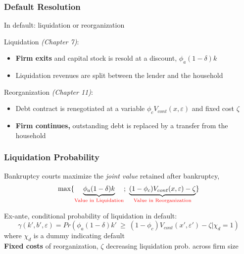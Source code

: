 \documentclass[aspectratio=169,xcolor=table]{beamer}
\begin{document}
\begin{frame}[label=LiqReorg] \frametitle{Default Resolution}

In default: liquidation or reorganization \hfill \hyperlink{Default}{} \vspace{5mm}

Liquidation \textit{(Chapter 7)}:
\begin{itemize} \small
    \item \textbf{Firm exits} and capital stock is resold at a discount, $\phi_a(1-\delta)k$
    \item Liquidation revenues are split between the lender and the household
\end{itemize} \normalsize \vspace{7mm}

Reorganization \textit{(Chapter 11)}:
\begin{itemize} \small
    \item Debt contract is renegotiated at a variable $\phi_c V_{cont}(x,\varepsilon)$ and fixed cost $\zeta$
    \item \textbf{Firm continues,} outstanding debt is replaced by a transfer from the household
\end{itemize} \normalsize   

\end{frame}

\begin{frame}[label=LiqReorg2] \frametitle{Liquidation Probability}

Bankruptcy courts maximize the \textit{joint value} retained after bankruptcy,
\begin{equation*} \label{eq:liquidation decision}
    \max \{ \underbrace{\phi_a (1-\delta) k}_{\textcolor{red}{\text{Value in Liquidation}}}   ; \ \underbrace{(1-\phi_c) V_{cont}(x,\varepsilon)- \zeta}_{\textcolor{red}{\text{Value in Reorganization}}}   \} 
\end{equation*}


Ex-ante, conditional probability of liquidation in default: 
\begin{equation*} \label{eq:liquidation probability}
    \gamma(k', b', \varepsilon) = Pr(\phi_a (1-\delta) k' \ \geq \ (1-\phi_c) V_{cont}(x',\varepsilon') - \zeta | \chi_d = 1)
\end{equation*}  
\small where $\chi_d$ is a dummy indicating default \normalsize \vspace{5mm} \\
\textbf{Fixed costs} of reorganization, $\zeta$ decreasing liquidation prob. across firm size     \hfill \hyperlink{liqprob}{}

\end{frame}
\end{document}
